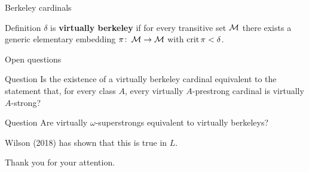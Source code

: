 \begin{frame}{Berkeley cardinals}
  \begin{block}{Definition}
    $\delta$ is \textbf{virtually berkeley} if for every transitive set $\operatorname{\mathcal M}$ there exists a generic elementary embedding $\pi\colon\operatorname{\mathcal M}\to\operatorname{\mathcal M}$ with $\operatorname{crit}\pi<\delta$.
  \end{block}



\end{frame}

\begin{frame}{Open questions}
  \begin{block}{Question}
    Is the existence of a virtually berkeley cardinal equivalent to the statement that, for every class $A$, every virtually $A$-prestrong cardinal is virtually $A$-strong?
  \end{block}

  \begin{block}{Question}
    Are virtually $\omega$-superstrongs equivalent to virtually berkeleys?

    Wilson (2018) has shown that this is true in $L$.
  \end{block}
\end{frame}

{
\begin{frame}
  \phantom{hidden text}
  \begin{center}
    {\LARGE Thank you for your attention.}
  \end{center}

\end{frame}}


